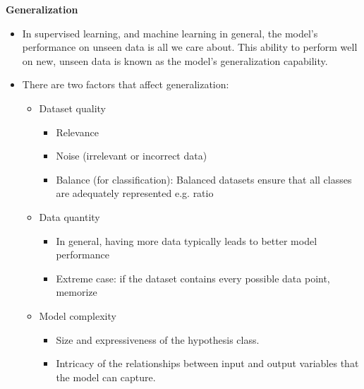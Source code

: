 \documentclass[8pt,twocolumn]{article}
\begin{document}
\textbf{Generalization} \vspace{-0.6em}
\begin{itemize}
    \setlength{\itemsep}{0pt}
    \setlength{\parskip}{0pt}
    \item In supervised learning, and machine learning in general, the model's performance on unseen data is all we care about. This ability to perform well on new, unseen data is known as the model's generalization capability. 
    \item There are two factors that affect generalization:
    \vspace{-0.6em}
    \begin{itemize}
        \setlength{\itemsep}{0pt}
        \setlength{\parskip}{0pt}
        \item Dataset quality \vspace{-0.3em}
        \begin{itemize}
            \setlength{\itemsep}{0pt}
            \setlength{\parskip}{0pt}
            \item Relevance
            \item Noise (irrelevant or incorrect data)
            \item Balance (for classification): Balanced datasets ensure that all classes are adequately represented e.g. ratio
        \end{itemize}
    \vspace{-0.3em}
        \item Data quantity\vspace{-0.3em}
        \begin{itemize}
            \setlength{\itemsep}{0pt}
            \setlength{\parskip}{0pt}
            \item In general, having more data typically leads to better model performance
            \item Extreme case: if the dataset contains every possible data point, memorize
        \end{itemize}
        \vspace{-0.3em}
        \item Model complexity\vspace{-0.3em}
        \begin{itemize}
            \setlength{\itemsep}{0pt}
            \setlength{\parskip}{0pt}
            \item Size and expressiveness of the hypothesis class.
            \item Intricacy of the relationships between input and output variables that the model can capture.
        \end{itemize}
    \end{itemize}
\end{itemize} \vspace{-0.6em}
\end{document}

